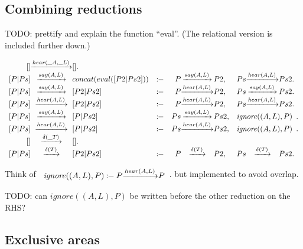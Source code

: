 \subsection{Combining reductions}

TODO: prettify and explain the function ``eval''. (The relational version is included further down.)

\newcommand{\Preduce}[3]{\ensuremath{#1 &\xrightarrow{#2}& #3}}
\newcommand{\Pignore}[1]{\ensuremath{\mathit{ignore}#1}}
\newcommand{\Pif}{\ensuremath{\mathbin{:\!\!-}}}
\[
\begin{array}{r@{}c@{}lcr@{}c@{}lr@{}c@{}l}
  \Preduce{[]}{hear(\_A,\_L)}{[]}. & &
\\\Preduce{[ P | Ps ]}{say(A,L)} {concat(eval([P2 | Ps2]))}  &\Pif& \Preduce{P}{say(A,L)}{P2}  ,&  \Preduce{Ps}{hear(A,L)}{Ps2}.
\\\Preduce{[ P | Ps ]}{say(A,L)} {[ P2 | Ps2 ]}  &\Pif& \Preduce{P} {hear(A,L)}{P2}   ,&  \Preduce{Ps}{say(A,L)} {Ps2} .
\\\Preduce{[ P | Ps ]}{hear(A,L)}{[ P2 | Ps2 ]}  &\Pif& \Preduce{P} {hear(A,L)}{P2}   ,&  \Preduce{Ps}{hear(A,L)}{Ps2} .
\\\Preduce{[ P | Ps ]}{say(A,L)} {[ P  | Ps2 ]}  &\Pif& \Preduce{Ps}{say(A,L)} {Ps2}  ,&  \multicolumn{3}{c}{\Pignore{((A,L),P)}}    .
\\\Preduce{[ P | Ps ]}{hear(A,L)}{[ P  | Ps2 ]}  &\Pif& \Preduce{Ps}{hear(A,L)}{Ps2}  ,&  \multicolumn{3}{c}{\Pignore{((A,L),P)}}    .
\\\Preduce{[]}{\delta(\_T)}{[]}. & &
\\\Preduce{[ P | Ps ]}{\delta(T)}{[ P2 | Ps2 ]}  &\Pif& \Preduce{P}{\delta(T)}{P2}    ,&  \Preduce{Ps}{\delta(T)}{Ps2}  .
\end{array}
\]

Think of
\(\begin{array}{r@{}c@{}l}\Pignore{((A,L),P)} \Pif
  \Preduce{P}{hear(A,L)}{P}\end{array}\).
but implemented to avoid overlap.

TODO: can \Pignore{((A,L),P)} be written before the other reduction on the RHS?



\subsection{Exclusive areas}
\newcommand{\rte}[1]{\ensuremath{\mathit{rte\_#1}}}

